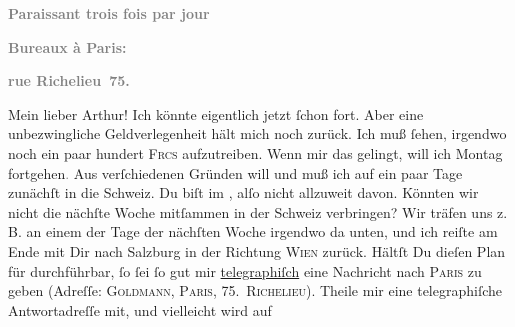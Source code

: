 \begin{ledgroupsized}[t]{13cm}
           \pstart
           \begin{otherlanguage}{french}\textcolor{gray}{\textbf{\textbf{Paraissant trois fois par jour}}}\end{otherlanguage}\pend
           \pstart
           \begin{otherlanguage}{french}\textcolor{gray}{\textbf{\textbf{Bureaux à Paris:}}}\end{otherlanguage}\pend
           \pstart
           \begin{otherlanguage}{french}\textcolor{gray}{\textbf{\textbf{rue Richelieu 75.}}}\end{otherlanguage}\pend
           \pstart\center{}Mein lieber Arthur!\pend\pstart
           Ich könnte eigentlich jetzt ſchon fort. Aber eine unbezwingliche Geldverlegenheit
               hält mich noch zurück. Ich muß ſehen, irgendwo noch ein paar hundert \textsc{Frcs} aufzutreiben. Wenn mir das gelingt, will ich Montag fortgehen\textcolor{gray}{.} Aus verſchiedenen
               Gründen will und muß ich auf ein paar Tage zunächſt in die Schweiz. Du biſt im \label{K_L02713-1v}\label{K_L02713-1h}, alſo nicht allzuweit davon. Könnten wir nicht
               die nächſte Woche mitſammen {\pb}in der Schweiz verbringen? Wir träfen uns z. B. an einem der Tage
               der nächſten Woche irgendwo da unten, und ich reiſte am Ende mit Dir nach Salzburg in der Richtung \textsc{Wien} zurück. Hältſt Du dieſen Plan für durchführbar, ſo ſei ſo gut mir \uline{telegraphiſch} eine Nachricht nach \textsc{Paris} zu geben (Adreſſe: \textsc{Goldmann}, \textsc{Paris, 75. Richelieu}). Theile mir eine telegraphiſche Antwortadreſſe mit, und vielleicht wird auf

\end{ledgroupsized}
